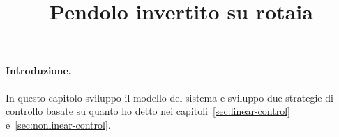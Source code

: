 \title{Pendolo invertito su rotaia}
\label{sec:pic}
\maketitle


\paragraph{Introduzione.}
In questo capitolo sviluppo il modello del sistema e sviluppo due strategie di controllo
basate su quanto ho detto nei capitoli~\ref{sec:linear-control} e~\ref{sec:nonlinear-control}.
 




